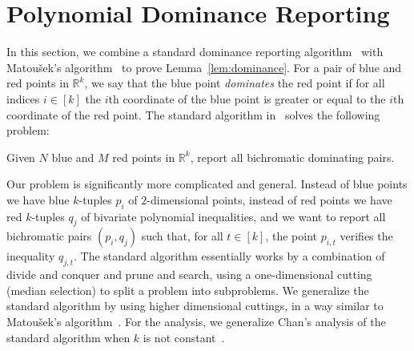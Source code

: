 \section{Polynomial Dominance Reporting}%
\label{sec:algo:dominance}


In this section, we combine a standard dominance reporting
algorithm~\cite{PS85} with Matou\v{s}ek's algorithm~\cite{Ma93} to prove
Lemma~\ref{lem:dominance}.
For a pair of blue and red points in $\mathbb{R}^k$, we say that the blue point
\emph{dominates} the red point if for all indices $i\in[k]$ the $i$th
coordinate of the blue point is greater or equal to the $i$th coordinate of the
red point.
The standard algorithm in~\cite{PS85} solves the following problem:
\begin{problem}
	Given $N$ blue
	and $M$ red points in $\mathbb{R}^k$, report all
	bichromatic dominating pairs.
\end{problem}
Our problem is significantly more complicated and general. Instead of blue points we
have blue $k$-tuples $p_i$ of $2$-dimensional points, instead of red points we have
red $k$-tuples $q_j$ of bivariate polynomial inequalities, and we want to report
all bichromatic pairs $(p_i,q_j)$ such that, for all $t \in [k]$,
the point $p_{i,t}$ verifies the inequality $q_{j,t}$.
The standard algorithm essentially works by a combination of divide and conquer
and prune and search, using a one-dimensional cutting (median selection) to
split a problem into subproblems. We generalize the standard algorithm by using
higher dimensional cuttings, in a way similar to Matou\v{s}ek's
algorithm~\cite{Ma93}. For the analysis, we generalize Chan's analysis
of the standard algorithm when $k$ is not constant~\cite{Cha08}.

